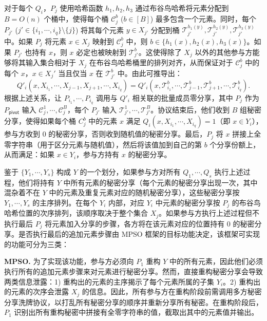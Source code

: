 对于每个 $Q_i$，$P_j$ 使用哈希函数 $h_1, h_2, h_3$ 通过布谷鸟哈希将元素分配到 $B = O(n)$ 个桶中，使得每个桶 $\mathcal{C}_j^b$ ($b \in [B]$) 最多包含一个元素。同时，每个 $P_{j'}$ ($j' \in \{{i_1},\cdots,{i_q}\}\setminus \{j\}$) 将其每个元素 $y \in X_{j'}$ 分配到桶 $\mathcal{T}_{j'}^{h_1(y)}, \mathcal{T}_{j'}^{h_2(y)}, \mathcal{T}_{j'}^{h_3(y)}$ 中。如果 $P_j$ 将元素 $x \in X_j$ 映射到 $\mathcal{C}_j^b$ 中，则 $b \in \{h_1(x),h_2(x),h_3(x)\}$。如果 $P_{j'}$ 也持有 $x$，则 $x$ 必定也被映射到 $\mathcal{T}_{j'}^b$。这使得除了 $X_j$ 以外的其他参与方能够将其输入集合相对于 $X_j$ 在布谷鸟哈希桶里的排列对齐，从而保证对于 $\mathcal{C}_j^b$ 中的每个 $x$，$x \in X_j'$ 当且仅当 $x$ 在 $\mathcal{T}_{j'}^b$ 中。由此可推导出：$$Q'_i(x,X_{i_1},\cdots,X_{j-1},X_{j+1},\cdots,X_{i_q}) = Q'_i(x,\mathcal{T}_{i_1}^b,\cdots,\mathcal{T}_{j-1}^b,\mathcal{T}_{j+1}^b,\cdots,\mathcal{T}_{i_q}^b).$$ 根据上述关系，让 $P_{i_1},\cdots,P_{i_q}$ 调用与 $Q'_i$ 相关联的批量成员零分享，其中 $P_j$ 作为 $P_{\mathsf{pivot}}$ 输入 $\mathcal{C}_j^1, \cdots, \mathcal{C}_j^B$，每个 $P_{j'}$ 输入 $\mathcal{T}_{j'}^1, \cdots, \mathcal{T}_{j'}^B$。协议结束后，他们收到 $B$ 组秘密分享，使得如果每个桶 $C_j^b$ 中的元素 $x$ 满足 $Q_i(x,X_{i_1},\cdots,X_{i_q}) = 1$（即 $x \in Y_i$），参与方收到 0 的秘密分享，否则收到随机值的秘密分享。最后，$P_j$ 将 $x$ 拼接上全零字符串（用于区分元素与随机值），然后将该值加到自己的第 $b$ 个分享份额上，从而满足：如果 $x \in Y_i$，参与方持有 $x$ 的秘密分享。

鉴于 $\{Y_1, \cdots, Y_s\}$ 构成 $Y$ 的一个划分，如果参与方对所有 $Q_1, \cdots, Q_s$ 执行上述过程，他们将持有 $Y$ 中所有元素的秘密分享（每个元素的秘密分享出现一次，其中混杂着不在 $Y$ 中的元素及重复元素对应的随机秘密分享），这些秘密分享按 $Y_1, \cdots, Y_s$ 的主序排列。在每个 $Y_i$ 内部，对应 $Y_i$ 中元素的秘密分享按 $P_j$ 的布谷鸟哈希位置的次序排列，该顺序取决于整个集合 $X_j$。如果参与方执行上述过程但不执行最后 $P_j$ 将元素加入分享的步骤，各方将在该元素对应的位置持有 0 的秘密分享。是否执行最后的追加元素步骤由 MPSO 框架的目标功能决定，该框架可实现的功能可分为三类：

\noindent\textbf{MPSO.} 为了实现该功能，参与方必须向 $P_1$ 重构 $Y$ 中的所有元素，因此他们必须执行所有的追加元素步骤来对元素进行秘密分享。然而，直接重构秘密分享会导致两类信息泄露：1) 重构出的元素的主序揭示了每个元素所属的子集 $Y_i$。2) 重构出的元素的次序会泄露 $X_j$ 的信息。因此，所有参与方在重构阶段前需调用多方秘密分享洗牌协议，以打乱所有秘密分享的顺序并重新分享所有秘密。在重构阶段后，$P_1$ 识别出所有重构秘密中拼接有全零字符串的值，截取出其中的元素值并输出。

